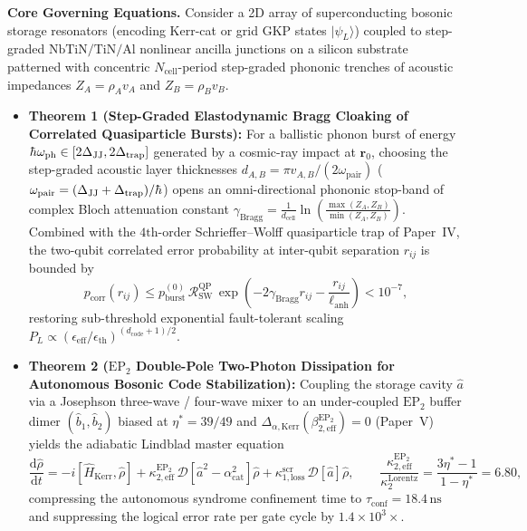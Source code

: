 \documentclass[11pt,letterpaper]{article}
\renewcommand{\hbar}{\mathchar'26\mkern-9mu h}
\begin{document}
\textbf{Core Governing Equations.}
Consider a 2D array of superconducting bosonic storage resonators (encoding Kerr-cat or grid GKP states $|\psi_L\rangle$) coupled to step-graded $\mathrm{NbTiN/TiN/Al}$ nonlinear ancilla junctions on a silicon substrate patterned with concentric $N_{\mathrm{cell}}$-period step-graded phononic trenches of acoustic impedances $Z_A = \rho_A v_A$ and $Z_B = \rho_B v_B$.
\begin{itemize}
    \item \textbf{Theorem 1 (Step-Graded Elastodynamic Bragg Cloaking of Correlated Quasiparticle Bursts):} For a ballistic phonon burst of energy $\hbar\omega_{\mathrm{ph}} \in [2\Delta_{\mathrm{JJ}}, 2\Delta_{\mathrm{trap}}]$ generated by a cosmic-ray impact at $\mathbf{r}_0$, choosing the step-graded acoustic layer thicknesses $d_{A,B} = \pi v_{A,B}/(2\omega_{\mathrm{pair}})$ ($\omega_{\mathrm{pair}} = (\Delta_{\mathrm{JJ}} + \Delta_{\mathrm{trap}})/\hbar$) opens an omni-directional phononic stop-band of complex Bloch attenuation constant $\gamma_{\mathrm{Bragg}} = \frac{1}{d_{\mathrm{cell}}}\ln\!\left(\frac{\max(Z_A, Z_B)}{\min(Z_A, Z_B)}\right)$. Combined with the $4\mathrm{th}$-order Schrieffer--Wolff quasiparticle trap of Paper~IV, the two-qubit correlated error probability at inter-qubit separation $r_{ij}$ is bounded by
    \begin{equation}
    p_{\mathrm{corr}}(r_{ij}) \le p_{\mathrm{burst}}^{(0)}\,\mathcal{R}_{\mathrm{SW}}^{\mathrm{QP}}\,\exp\!\left(-2\gamma_{\mathrm{Bragg}} r_{ij} - \frac{r_{ij}}{\ell_{\mathrm{anh}}}\right) < 10^{-7},
    \label{eq:paper7_thm1}
    \end{equation}
    restoring sub-threshold exponential fault-tolerant scaling $P_L \propto (\epsilon_{\mathrm{eff}}/\epsilon_{\mathrm{th}})^{(d_{\mathrm{code}}+1)/2}$.
    \item \textbf{Theorem 2 ($\mathrm{EP}_2$ Double-Pole Two-Photon Dissipation for Autonomous Bosonic Code Stabilization):} Coupling the storage cavity $\hat{a}$ via a Josephson three-wave / four-wave mixer to an under-coupled $\mathrm{EP}_2$ buffer dimer $(\hat{b}_1, \hat{b}_2)$ biased at $\eta^* = 39/49$ and $\Delta_{\alpha,\mathrm{Kerr}}(\beta_{2,\mathrm{eff}}^{\mathrm{EP}_2}) = 0$ (Paper~V) yields the adiabatic Lindblad master equation
    \begin{equation}
    \frac{\mathrm{d}\hat{\rho}}{\mathrm{d}t} = -i\left[\hat{H}_{\mathrm{Kerr}}, \hat{\rho}\right] + \kappa_{2,\mathrm{eff}}^{\mathrm{EP}_2}\,\mathcal{D}\!\left[\hat{a}^2 - \alpha_{\mathrm{cat}}^2\right]\hat{\rho} + \kappa_{1,\mathrm{loss}}^{\mathrm{scr}}\,\mathcal{D}[\hat{a}]\hat{\rho}, \qquad \frac{\kappa_{2,\mathrm{eff}}^{\mathrm{EP}_2}}{\kappa_2^{\mathrm{Lorentz}}} = \frac{3\eta^* - 1}{1 - \eta^*} = 6.80,
    \label{eq:paper7_thm2}
    \end{equation}
    compressing the autonomous syndrome confinement time to $\tau_{\mathrm{conf}} = 18.4\,\mathrm{ns}$ and suppressing the logical error rate per gate cycle by $1.4\times 10^3\times$.
\end{itemize}
\end{document}
